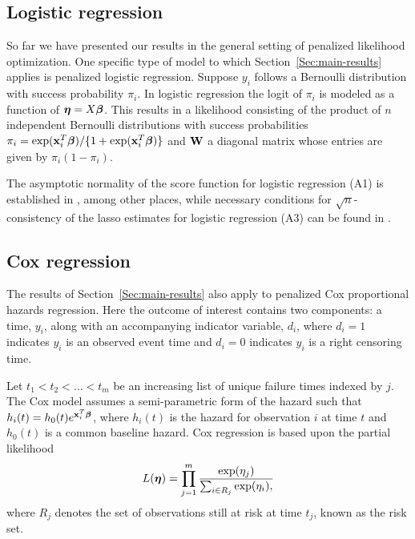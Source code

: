 \subsection{Logistic regression}

So far we have presented our results in the general setting of penalized likelihood optimization. One specific type of model to which Section~\ref{Sec:main-results} applies is penalized logistic regression. Suppose $y_i$ follows a Bernoulli distribution with success probability $\pi_i$. In logistic regression the logit of $\pi_i$ is modeled as a function of $\boldsymbol{\eta} = X\boldsymbol{\beta}$.  This results in a likelihood consisting of the product of $n$ independent Bernoulli distributions with success probabilities $\pi_i = \exp(\mathbf{x}_i^T\boldsymbol{\beta})/\{1 + \exp(\mathbf{x}_i^T\boldsymbol{\beta})\}$ and $\mathbf{W}$ a diagonal matrix whose entries are given by $\pi_i(1-\pi_i)$.

The asymptotic normality of the score function for logistic regression (A1) is established in \citet{McCullagh1989}, among other places, while necessary conditions for $\sqrt{n}$-consistency of the lasso estimates for logistic regression (A3) can be found in \citet{SCAD}.

\subsection{Cox regression}
\label{Sec:cox}

The results of Section~\ref{Sec:main-results} also apply to penalized Cox proportional hazards regression. Here the outcome of interest contains two components: a time, $y_i$, along with an accompanying indicator variable, $d_i$, where $d_i = 1$ indicates $y_i$ is an observed event time and $d_i = 0$ indicates $y_i$ is a right censoring time.

Let $t_1 < t_2 < \ldots < t_m$ be an increasing list of unique failure times indexed by $j$. The Cox model assumes a semi-parametric form of the hazard such that $h_i(t) = h_0(t)e^{\mathbf{x}_i^T \boldsymbol{\beta}}$, where $h_i(t)$ is the hazard for observation $i$ at time $t$ and $h_0(t)$ is a common baseline hazard. Cox regression is based upon the partial likelihood \citep{Cox1972}
\begin{equation*}
L(\boldsymbol{\eta})  = \prod_{j=1}^{m} \frac{\exp(\eta_j)}{\sum_{i \in R_j} \exp(\eta_i),} 
\end{equation*}
where $R_j$ denotes the set of observations still at risk at time $t_j$, known as the risk set.

